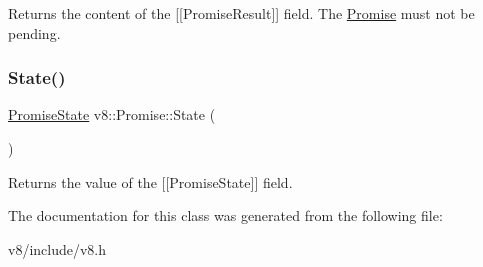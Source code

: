 Returns the content of the \mbox{[}\mbox{[}Promise\+Result\mbox{]}\mbox{]} field. The \mbox{\hyperlink{classv8_1_1Promise}{Promise}} must not be pending. \mbox{\label{classv8_1_1Promise_abc011691f131e23939b167a4fe3f9391}} 
\subsubsection{\texorpdfstring{State()}{State()}}
{\footnotesize\ttfamily \mbox{\hyperlink{classv8_1_1Promise_a0c357b9d99a634f98a5a203b0a322544}{Promise\+State}} v8\+::\+Promise\+::\+State (\begin{DoxyParamCaption}{ }\end{DoxyParamCaption})}

Returns the value of the \mbox{[}\mbox{[}Promise\+State\mbox{]}\mbox{]} field. 

The documentation for this class was generated from the following file\+:\begin{DoxyCompactItemize}
\item 
v8/include/v8.\+h\end{DoxyCompactItemize}
